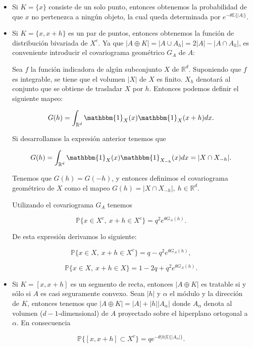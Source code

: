 \begin{itemize}
\item Si $K=\{x\}$ consiste de un solo punto, entonces obtenemos la probabilidad de que $x$ no pertenezca a ning\'un objeto, la cual queda determinada por $e^{-\theta\mathbb{E}\{|A|\}}$.
\item Si $K=\{x,x+h\}$ es un par de puntos, entonces obtenemos la funci\'on de distribuci\'on bivariada de $X^c$. Ya que $|A\oplus K|=|A\cup A_h|=2|A|-|A\cap A_h|$, es conveniente introducir el covariograma geom\'etrico $G_A$ de $A$:

    Sea $f$ la funci\'on indicadora de alg\'un subconjunto $X$ de $\mathbb{R}^d$. Suponiendo que $f$ es integrable, se tiene que el volumen $|X|$ de $X$ es finito. $X_h$ denotar\'a al conjunto que se obtiene de trasladar $X$ por $h$. Entonces podemos definir el siguiente mapeo:

    \[G(h)=\int_{\mathbb{R}^d}\mathbbm{1}_X(x)\mathbbm{1}_X(x+h)dx.\]

    Si desarrollamos la expresi\'on anterior tenemos que

    \[G(h)=\int_{\mathbb{R}^d}\mathbbm{1}_X(x)\mathbbm{1}_{X_{-h}}(x)dx=|X\cap X_{-h}|.\]

    Tenemos que $G(h)=G(-h)$, y entonces definimos el covariograma geom\'etrico de $X$ como el mapeo $G(h)=|X\cap X_{-h}|,\ h\in\mathbb{R}^d$.

    Utilizando el covariograma $G_A$ tenemos

    \[\mathbb{P}\{x\in X^c,\ x+h\in X^c\}=q^2e^{\theta G_A(h)}.\]

    De esta expresi\'on derivamos lo siguiente:

    \[\mathbb{P}\{x\in X,\ x+h\in X^c\}=q-q^2e^{\theta G_A(h)},\]

    \[\mathbb{P}\{x\in X,\ x+h\in X\}=1-2q+q^2e^{\theta G_A(h)}.\]

\item Si $K=[x,x+h]$ es un segmento de recta, entonces $|A\oplus K|$ es tratable si y s\'olo si $A$ es casi seguramente convexo. Sean $|h|$ y $\alpha$ el m\'odulo y la direcci\'on de $K$, entonces tenemos que $|A\oplus K|=|A|+|h||A_\alpha|$ donde $A_\alpha$ denota al volumen ($d-1$-dimensional) de $A$ proyectado sobre el hiperplano ortogonal a $\alpha$. En consecuencia

    \[\mathbb{P}\{[x,x+h]\subset X^c\}=qe^{-\theta|h|\mathbb{E}\{|A_\alpha|\}}.\]


\end{itemize}
